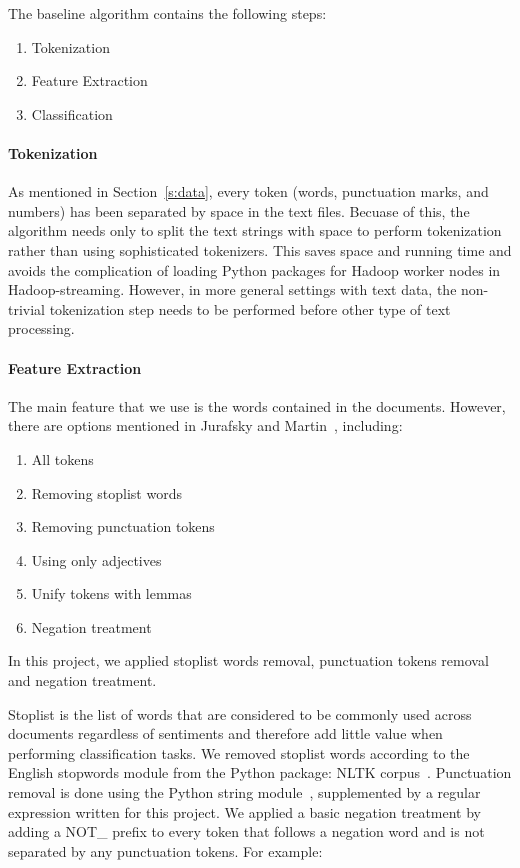 The baseline algorithm contains the following steps:

\begin{enumerate}
	\item Tokenization
	\item Feature Extraction
	\item Classification
\end{enumerate}

\paragraph{Tokenization}
As mentioned in Section~\ref{s:data}, every token (words, punctuation
marks, and numbers) has been separated by space in the text
files. Becuase of this, the algorithm needs only to split the text
strings with space to perform tokenization rather than using
sophisticated tokenizers. This saves space and running time and avoids
the complication of loading Python packages for Hadoop worker nodes in
Hadoop-streaming. However, in more general settings with text data,
the non-trivial tokenization step needs to be performed before other
type of text processing.

\paragraph{Feature Extraction}
The main feature that we use is the words contained in the documents.
However, there are options mentioned in Jurafsky and
Martin~\cite{hid-sp18-405-sentiment-jurafsky2009}, including:
\begin{enumerate}
	\item All tokens
	\item Removing stoplist words
	\item Removing punctuation tokens
	\item Using only adjectives
	\item Unify tokens with lemmas
	\item Negation treatment
\end{enumerate}
In this project, we applied stoplist words removal, punctuation tokens 
removal and negation treatment. 

Stoplist is the list of words that are considered to be commonly used
across documents regardless of sentiments and therefore add little
value when performing classification tasks. We removed stoplist words
according to the English stopwords module from the Python package:
NLTK corpus~\cite{hid-sp18-405-sentiment-stopworddoc}. Punctuation
removal is done using the Python string
module~\cite{hid-sp18-405-sentiment-punctuationdoc}, supplemented by a
regular expression written for this project. We applied a basic
negation treatment by adding a NOT\_ prefix to every token that
follows a negation word and is not separated by any punctuation
tokens. For example:

